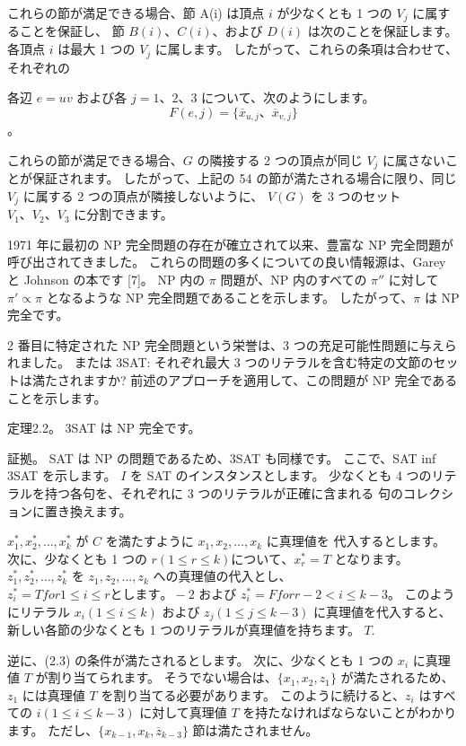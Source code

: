 
これらの節が満足できる場合、節 A(i) は頂点 $i$ が少なくとも 1 つの $V_j$ に属することを保証し、
節 $B(i)、C(i)$、および $D(i)$ は次のことを保証します。 各頂点 $i$ は最大 1 つの $V_j$ に属します。 
したがって、これらの条項は合わせて、それぞれの

各辺 $e = uv$ および各 $j = 1、2、3$ について、次のようにします。
$$F(e,j) = \{\overline{x}_{u,j}、\overline{x}_{v,j}\}$$。

これらの節が満足できる場合、$G$ の隣接する 2 つの頂点が同じ $V_j$ に属さないことが保証されます。
したがって、上記の 54 の節が満たされる場合に限り、同じ $V_j$ に属する 2 つの頂点が隣接しないように、
$V(G)$ を 3 つのセット $V_1、V_2、V_3$ に分割できます。

1971 年に最初の NP 完全問題の存在が確立されて以来、豊富な NP 完全問題が呼び出されてきました。
これらの問題の多くについての良い情報源は、Garey と Johnson の本です [7]。 
NP 内の $\pi$ 問題が、NP 内のすべての $\pi''$ に対して $\pi' \propto  \pi$ となるような NP 完全問題であることを示します。 したがって、$\pi$ は NP 完全です。

2 番目に特定された NP 完全問題という栄誉は、3 つの充足可能性問題に与えられました。 
または 3SAT: それぞれ最大 3 つのリテラルを含む特定の文節のセットは満たされますか? 
前述のアプローチを適用して、この問題が NP 完全であることを示します。

定理2.2。 3SAT は NP 完全です。

証拠。
SAT は NP の問題であるため、3SAT も同様です。
ここで、SAT inf 3SAT を示します。 $I$ を SAT のインスタンスとします。
少なくとも 4 つのリテラルを持つ各句を、それぞれに 3 つのリテラルが正確に含まれる
句のコレクションに置き換えます。

$x_1^*, x_2^*, \dots, x_k^*$ が $C$ を満たすように $x_1, x_2, \dots, x_k$ に真理値を
代入するとします。 次に、少なくとも 1 つの $r (1 \leq r \leq k) について、x_r^* = T$ となります。 
$z_1^*, z_2^*, \dots, z_k^*$ を $z_1, z_2, \dots, z_k$ への真理値の代入とし、
$z_i^* = T for 1 \leq i \leq r とします。 -2$ および $z_i^* = F for r-2 < i \leq k-3$。
このようにリテラル $x_i (1 \leq i \leq k)$ および $z_j (1 \leq j \leq k-3)$ に真理値を代入すると、
新しい各節の少なくとも 1 つのリテラルが真理値を持ちます。 $T$.

逆に、(2.3) の条件が満たされるとします。 
次に、少なくとも 1 つの $x_i$ に真理値 $T$ が割り当てられます。
そうでない場合は、$\{x_1, x_2, z_1\}$ が満たされるため、
$z_1$ には真理値 $T$ を割り当てる必要があります。
このように続けると、$z_i$ はすべての $i (1 \leq i \leq k-3)$ に対して真理値 $T$ を持たなければならないことがわかります。
ただし、$\{x_{k-1}, x_k, \overline{z}_{k-3}\}$ 節は満たされません。

